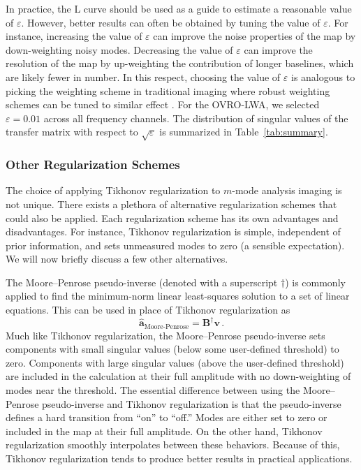 \documentclass[twocolumn]{aastex61}
\renewcommand{\b}{\pmb}
\begin{document}
In practice, the L curve should be used as a guide to estimate a reasonable value of $\varepsilon$.
However, better results can often be obtained by tuning the value of $\varepsilon$. For instance,
increasing the value of $\varepsilon$ can improve the noise properties of the map by down-weighting
noisy modes. Decreasing the value of $\varepsilon$ can improve the resolution of the map by
up-weighting the contribution of longer baselines, which are likely fewer in number. In this
respect, choosing the value of $\varepsilon$ is analogous to picking the weighting scheme in
traditional imaging where robust weighting schemes can be tuned to similar effect \citep{briggs}.
For the OVRO-LWA, we selected $\varepsilon = 0.01$ across all frequency channels. The distribution
of singular values of the transfer matrix with respect to $\sqrt{\varepsilon}$ is summarized in
Table~\ref{tab:summary}.

\subsubsection{Other Regularization Schemes}

The choice of applying Tikhonov regularization to $m$-mode analysis imaging is not unique. There
exists a plethora of alternative regularization schemes that could also be applied. Each
regularization scheme has its own advantages and disadvantages. For instance, Tikhonov
regularization is simple, independent of prior information, and sets unmeasured modes to zero (a
sensible expectation). We will now briefly discuss a few other alternatives.

The Moore--Penrose pseudo-inverse (denoted with a superscript $\dagger$) is commonly applied to find
the minimum-norm linear least-squares solution to a set of linear equations. This can be used in
place of Tikhonov regularization as
\begin{equation}
    \b{\hat a}_\text{Moore-Penrose} = \b B^\dagger\b v\,.
\end{equation}
Much like Tikhonov regularization, the Moore--Penrose pseudo-inverse sets components with small
singular values (below some user-defined threshold) to zero. Components with large singular values
(above the user-defined threshold) are included in the calculation at their full amplitude with no
down-weighting of modes near the threshold. The essential difference between using the
Moore--Penrose pseudo-inverse and Tikhonov regularization is that the pseudo-inverse defines a hard
transition from ``on'' to ``off.'' Modes are either set to zero or included in the map at their full
amplitude. On the other hand, Tikhonov regularization smoothly interpolates between these behaviors.
Because of this, Tikhonov regularization tends to produce better results in practical applications.
\end{document}
